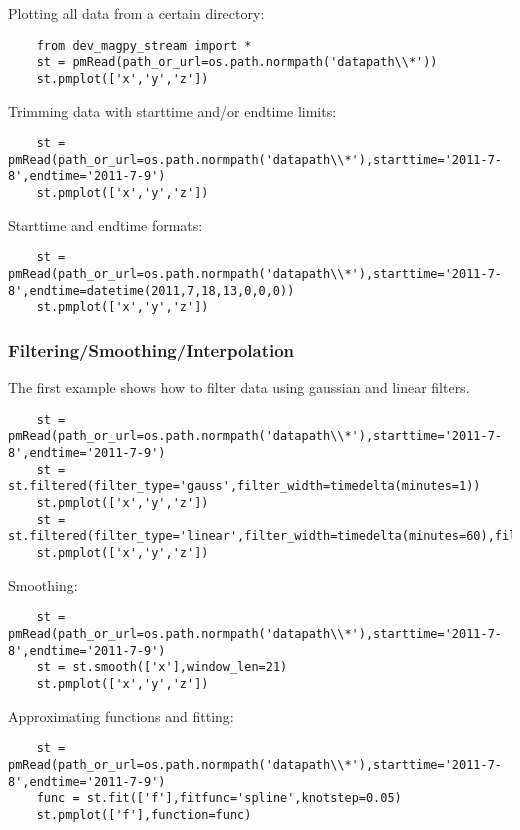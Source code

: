 Plotting all data from a certain directory:
\begin{verbatim}
    from dev_magpy_stream import *
    st = pmRead(path_or_url=os.path.normpath('datapath\\*'))
    st.pmplot(['x','y','z'])
\end{verbatim}

Trimming data with starttime and/or endtime limits:
\begin{verbatim}
    st = pmRead(path_or_url=os.path.normpath('datapath\\*'),starttime='2011-7-8',endtime='2011-7-9')
    st.pmplot(['x','y','z'])
\end{verbatim}

Starttime and endtime formats:
\begin{verbatim}
    st = pmRead(path_or_url=os.path.normpath('datapath\\*'),starttime='2011-7-8',endtime=datetime(2011,7,18,13,0,0,0))
    st.pmplot(['x','y','z'])
\end{verbatim}


\subsubsection{Filtering/Smoothing/Interpolation}

The first example shows how to filter data using gaussian and linear filters.
\begin{verbatim}
    st = pmRead(path_or_url=os.path.normpath('datapath\\*'),starttime='2011-7-8',endtime='2011-7-9')
    st = st.filtered(filter_type='gauss',filter_width=timedelta(minutes=1))
    st.pmplot(['x','y','z'])
    st = st.filtered(filter_type='linear',filter_width=timedelta(minutes=60),filter_offset=timedelta(minutes=30))
    st.pmplot(['x','y','z'])
\end{verbatim}

Smoothing:
\begin{verbatim}
    st = pmRead(path_or_url=os.path.normpath('datapath\\*'),starttime='2011-7-8',endtime='2011-7-9')
    st = st.smooth(['x'],window_len=21)
    st.pmplot(['x','y','z'])
\end{verbatim}

Approximating functions and fitting:
\begin{verbatim}
    st = pmRead(path_or_url=os.path.normpath('datapath\\*'),starttime='2011-7-8',endtime='2011-7-9')
    func = st.fit(['f'],fitfunc='spline',knotstep=0.05)
    st.pmplot(['f'],function=func)
\end{verbatim}

